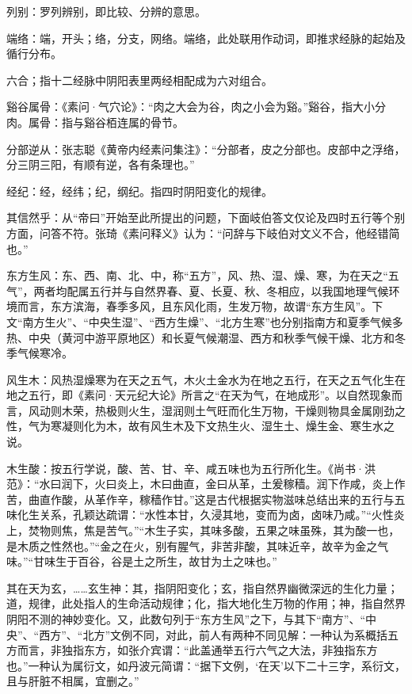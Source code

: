 \documentclass[12pt]{ctexbook}
\begin{document}
\begin{jiaozhu}
  \item 列别：罗列辨别，即比较、分辨的意思。
  \item 端络：端，开头；络，分支，网络。端络，此处联用作动词，即推求经脉的起始及循行分布。
  \item 六合；指十二经脉中阴阳表里两经相配成为六对组合。
  \item 谿谷属骨：《素问·气穴论》：“肉之大会为谷，肉之小会为谿。”谿谷，指大小分肉。属骨：指与谿谷栢连属的骨节。
  \item 分部逆从：张志聪《黄帝内经素问集注》：“分部者，皮之分部也。皮部中之浮络，分三阴三阳，有顺有逆，各有条理也。”
  \item 经纪：经，经纬；纪，纲纪。指四时阴阳变化的规律。
  \item 其信然乎：从“帝曰”开始至此所提出的问题，下面岐伯答文仅论及四时五行等个别方面，问答不符。张琦《素问释义》认为：“问辞与下岐伯对文义不合，他经错简也。”
  \item 东方生风：东、西、南、北、中，称“五方”，风、热、湿、燥、寒，为在天之“五气”，两者均配属五行并与自然界春、夏、长夏、秋、冬相应，以我国地理气候环境而言，东方滨海，春季多风，且东风化雨，生发万物，故谓“东方生风”。下文“南方生火”、“中央生湿”、“西方生燥”、“北方生寒”也分别指南方和夏季气候多热、中央（黄河中游平原地区）和长夏气候潮湿、西方和秋季气候干燥、北方和冬季气候寒冷。
  \item 风生木：风热湿燥寒为在天之五气，木火土金水为在地之五行，在天之五气化生在地之五行，即《素问·天元纪大论》所言之“在天为气，在地成形”。以自然现象而言，风动则木荣，热极则火生，湿润则土气旺而化生万物，干燥则物具金属刚劲之性，气为寒凝则化为木，故有风生木及下文热生火、湿生土、燥生金、寒生水之说。
  \item 木生酸：按五行学说，酸、苦、甘、辛、咸五味也为五行所化生。《尚书·洪范》：“水曰润下，火曰炎上，木曰曲直，金曰从革，土爰稼穑。润下作咸，炎上作苦，曲直作酸，从革作辛，稼穑作甘。”这是古代根据实物滋味总结出来的五行与五味化生关系，孔颖达疏谓：“水性本甘，久浸其地，变而为卤，卤味乃咸。”“火性炎上，焚物则焦，焦是苦气。”“木生子实，其味多酸，五果之味虽殊，其为酸一也，是木质之性然也。”“金之在火，别有腥气，非苦非酸，其味近辛，故辛为金之气味。”“甘味生于百谷，谷是土之所生，故甘为土之味也。”
  \item 其在天为玄，……玄生神：其，指阴阳变化；玄，指自然界幽微深远的生化力量；道，规律，此处指人的生命活动规律；化，指大地化生万物的作用；神，指自然界阴阳不测的神妙变化。又，此数句列于“东方生风”之下，与其下“南方”、“中央”、“西方”、“北方”文例不同，对此，前人有两种不同见解：一种认为系概括五方而言，非独指东方，如张介宾谓：“此盖通举五行六气之大法，非独指东方也。”一种认为属衍文，如丹波元简谓：“据下文例，‘在天’以下二十三字，系衍文，且与肝脏不相属，宜删之。”

\end{jiaozhu}
\end{document}
